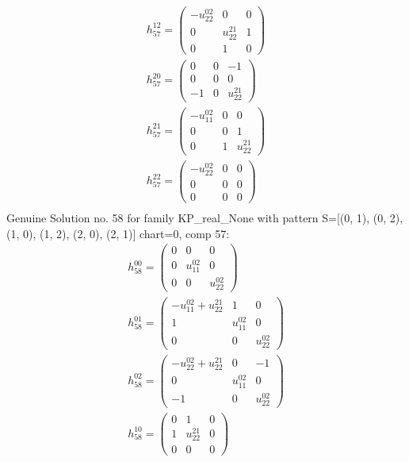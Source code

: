\documentclass[a4paper, 11pt, twoside, onecolumn]{article}
\begin{document}
\begin{landscape}
\begin{gather*}
	 h_{57}^{12}=\begin{pmatrix}- u^{02}_{22} & 0 & 0\\0 & u^{21}_{22} & 1\\0 & 1 & 0\end{pmatrix}\\ 
	 h_{57}^{20}=\begin{pmatrix}0 & 0 & -1\\0 & 0 & 0\\-1 & 0 & u^{21}_{22}\end{pmatrix}\\ 
	 h_{57}^{21}=\begin{pmatrix}- u^{02}_{11} & 0 & 0\\0 & 0 & 1\\0 & 1 & u^{21}_{22}\end{pmatrix}\\ 
	 h_{57}^{22}=\begin{pmatrix}- u^{02}_{22} & 0 & 0\\0 & 0 & 0\\0 & 0 & 0\end{pmatrix}\\ 
\end{gather*} 
Genuine Solution no. 58 for family KP_real_None with pattern S=[(0, 1), (0, 2), (1, 0), (1, 2), (2, 0), (2, 1)] chart=0, comp 57: 
\begin{gather*} 
	 h_{58}^{00}=\begin{pmatrix}0 & 0 & 0\\0 & u^{02}_{11} & 0\\0 & 0 & u^{02}_{22}\end{pmatrix}\\ 
	 h_{58}^{01}=\begin{pmatrix}- u^{02}_{11} + u^{21}_{22} & 1 & 0\\1 & u^{02}_{11} & 0\\0 & 0 & u^{02}_{22}\end{pmatrix}\\ 
	 h_{58}^{02}=\begin{pmatrix}- u^{02}_{22} + u^{21}_{22} & 0 & -1\\0 & u^{02}_{11} & 0\\-1 & 0 & u^{02}_{22}\end{pmatrix}\\ 
	 h_{58}^{10}=\begin{pmatrix}0 & 1 & 0\\1 & u^{21}_{22} & 0\\0 & 0 & 0\end{pmatrix}\\ 

\end{gather*}
\end{landscape}
\end{document}
